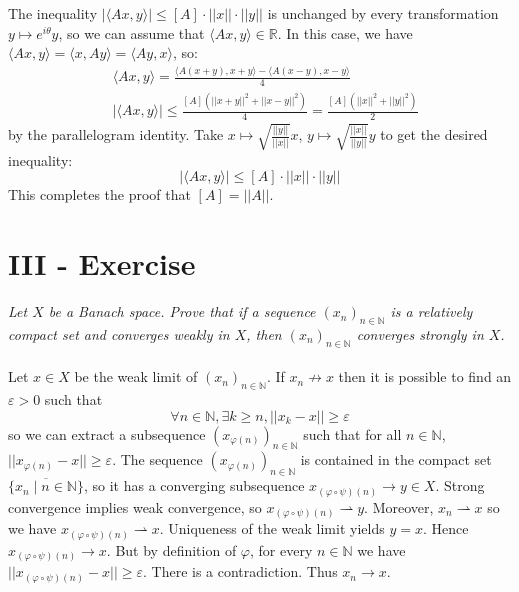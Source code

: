 \documentclass[11pt,a4paper]{article}
\newcommand{\ph}{\varphi}
\newcommand{\il}{\textit}
\newcommand{\N}{\mathbb{N}}
\newcommand{\R}{\mathbb{R}}
\newcommand{\1}{\mathbbm{1}}
\begin{document}
The inequality $|\langle Ax , y \rangle| \leq [A] \cdot ||x|| \cdot ||y||$ is unchanged by every transformation $y \mapsto e^{i\theta} y$, so we can assume that $\langle Ax , y \rangle \in \R$. In this case, we have $\langle Ax , y \rangle = \langle x , Ay \rangle = \langle Ay , x \rangle$, so:
\begin{align*} & \langle Ax , y \rangle = \frac{\langle A(x+y) , x+y \rangle - \langle A(x-y) , x-y \rangle}{4} \\
& |\langle Ax , y \rangle| \leq \frac{[A]\left(||x+y||^2 + ||x-y||^2 \right)}{4} = \frac{[A]\left(||x||^2 + ||y||^2 \right)}{2}
\end{align*}
by the parallelogram identity. Take $x \mapsto \sqrt{\frac{||y||}{||x||}} x$, $y \mapsto \sqrt{\frac{||x||}{||y||}} y$ to get the  desired inequality:
\[ |\langle Ax , y \rangle| \leq [A] \cdot ||x|| \cdot ||y|| \]
This completes the proof that $[A] = ||A||$.
\newpage
\section*{III - Exercise}
\il{Let $X$ be a Banach space. Prove that if a sequence $(x_n)_{n\in\N}$ is a relatively compact set and converges weakly in $X$, then $(x_n)_{n\in\N}$ converges strongly in $X$.}\\\\
Let $x \in X$ be the weak limit of $(x_n)_{n\in\N}$. If $x_n \not\to x$ then it is possible to find an $\varepsilon > 0$ such that
\[ \forall n \in \N , \exists k \geq n , ||x_k-x|| \geq \varepsilon \]
so we can extract a subsequence $(x_{\ph(n)})_{n\in\N}$ such that for all $n \in \N$, $||x_{\ph(n)} - x|| \geq \varepsilon$. The sequence $(x_{\ph(n)})_{n\in\N}$ is contained in the compact set $\overline{\{x_n\mid n \in \N\}}$, so it has a converging subsequence $x_{(\ph \circ \psi)(n)}\to y \in X$. Strong convergence implies weak convergence, so $x_{(\ph \circ \psi)(n)} \rightharpoonup y$. Moreover, $x_n \rightharpoonup x$ so we have $x_{(\ph \circ \psi)(n)} \rightharpoonup x$. Uniqueness of the weak limit yields $y = x$. Hence $x_{(\ph \circ \psi)(n)} \to x$. But by definition of $\ph$, for every $n \in \N$ we have $||x_{(\ph\circ\psi)(n)} - x|| \geq \varepsilon$. There is a contradiction. Thus $x_n \to x$.
\end{document}
